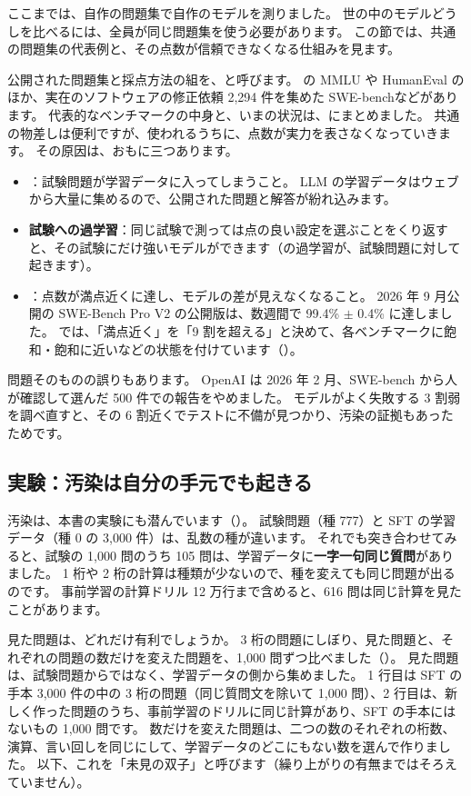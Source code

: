 ここまでは、自作の問題集で自作のモデルを測りました。
世の中のモデルどうしを比べるには、全員が同じ問題集を使う必要があります。
この節では、共通の問題集の代表例と、その点数が信頼できなくなる仕組みを見ます。

公開された問題集と採点方法の組を、と呼びます。
の MMLU や HumanEval のほか、実在のソフトウェアの修正依頼 2,294 件を集めた SWE-bench\cite{jimenez2024swebench}などがあります。
代表的なベンチマークの中身と、いまの状況は、にまとめました。
共通の物差しは便利ですが、使われるうちに、点数が実力を表さなくなっていきます。
その原因は、おもに三つあります。
\begin{itemize}
\item {}：試験問題が学習データに入ってしまうこと。
LLM の学習データはウェブから大量に集めるので、公開された問題と解答が紛れ込みます。
\item \textbf{試験への過学習}：同じ試験で測っては点の良い設定を選ぶことをくり返すと、その試験にだけ強いモデルができます（の過学習が、試験問題に対して起きます）。
\item {}：点数が満点近くに達し、モデルの差が見えなくなること。
2026 年 9 月公開の SWE-Bench Pro V2 の公開版は、数週間で 99.4\% $\pm$ 0.4\% に達しました。
では、「満点近く」を「9 割を超える」と決めて、各ベンチマークに飽和・飽和に近いなどの状態を付けています（）。
\end{itemize}
問題そのものの誤りもあります。
OpenAI は 2026 年 2 月、SWE-bench から人が確認して選んだ 500 件での報告をやめました。
モデルがよく失敗する 3 割弱を調べ直すと、その 6 割近くでテストに不備が見つかり、汚染の証拠もあったためです。

\subsection*{実験：汚染は自分の手元でも起きる}

汚染は、本書の実験にも潜んでいます（）。
試験問題（種 777）と SFT の学習データ（種 0 の 3,000 件）は、乱数の種が違います。
それでも突き合わせてみると、試験の 1,000 問のうち 105 問は、学習データに\textbf{一字一句同じ質問}がありました。
1 桁や 2 桁の計算は種類が少ないので、種を変えても同じ問題が出るのです。
事前学習の計算ドリル 12 万行まで含めると、616 問は同じ計算を見たことがあります。

見た問題は、どれだけ有利でしょうか。
3 桁の問題にしぼり、見た問題と、それぞれの問題の数だけを変えた問題を、1,000 問ずつ比べました（）。
見た問題は、試験問題からではなく、学習データの側から集めました。
1 行目は SFT の手本 3,000 件の中の 3 桁の問題（同じ質問文を除いて 1,000 問）、2 行目は、新しく作った問題のうち、事前学習のドリルに同じ計算があり、SFT の手本にはないもの 1,000 問です。
数だけを変えた問題は、二つの数のそれぞれの桁数、演算、言い回しを同じにして、学習データのどこにもない数を選んで作りました。
以下、これを「未見の双子」と呼びます（繰り上がりの有無まではそろえていません）。

